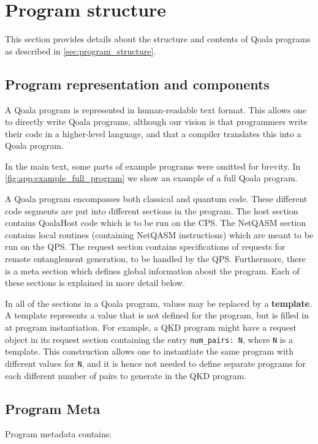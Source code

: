 \section{Program structure}
\label{app:program_structure}
This section provides details about the structure and contents of Qoala programs as described in \cref{sec:program_structure}.


\subsection{Program representation and components}
A Qoala program is represented in human-readable text format.
This allows one to directly write Qoala programs, although our vision is that programmers write their code in a higher-level language, and that a compiler translates this into a Qoala program.

In the main text, some parts of example programs were omitted for brevity.
In \cref{fig:app:example_full_program} we show an example of a full Qoala program.

A Qoala program encompasses both classical and quantum code.
These different code segments are put into different sections in the program.
The host section contains QoalaHost code which is to be run on the CPS.
The NetQASM section contains local routines (containing NetQASM instructions) which are meant to be run on the QPS.
The request section contains specifications of requests for remote entanglement generation, to be handled by the QPS.
Furthermore, there is a meta section which defines global information about the program.
Each of these sections is explained in more detail below.

In all of the sections in a Qoala program, values may be replaced by a \textbf{template}.
A template represents a value that is not defined for the program, but is filled in at program instantiation. For example, a QKD program might have a request object in its request section containing the entry \texttt{num\_pairs: {N}}, where \texttt{{N}} is a template. This construction allows one to instantiate the same program with different values for \texttt{N}, and it is hence not needed to define separate programs for each different number of pairs to generate in the QKD program.

\subsection{Program Meta}
Program metadata contains:

